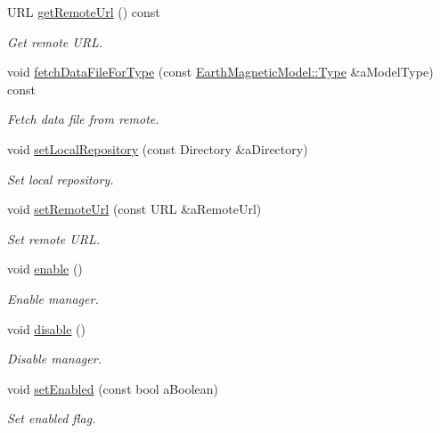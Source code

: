 \begin{DoxyCompactItemize}
U\+RL \hyperlink{classostk_1_1physics_1_1environment_1_1magnetic_1_1earth_1_1_manager_afb13ee2d8dc23d825960f0f2657f6df9}{get\+Remote\+Url} () const
\begin{DoxyCompactList}\small\item\em Get remote U\+RL. \end{DoxyCompactList}\item 
void \hyperlink{classostk_1_1physics_1_1environment_1_1magnetic_1_1earth_1_1_manager_ac671438e0faf3b1b2914a35d4f4f8edb}{fetch\+Data\+File\+For\+Type} (const \hyperlink{classostk_1_1physics_1_1environment_1_1magnetic_1_1_earth_a30a064d87b6fce338e76aebd3043b6b6}{Earth\+Magnetic\+Model\+::\+Type} \&a\+Model\+Type) const
\begin{DoxyCompactList}\small\item\em Fetch data file from remote. \end{DoxyCompactList}\item 
void \hyperlink{classostk_1_1physics_1_1environment_1_1magnetic_1_1earth_1_1_manager_a72535c0bb963e3936fa73e5d130d6889}{set\+Local\+Repository} (const Directory \&a\+Directory)
\begin{DoxyCompactList}\small\item\em Set local repository. \end{DoxyCompactList}\item 
void \hyperlink{classostk_1_1physics_1_1environment_1_1magnetic_1_1earth_1_1_manager_aba782ea0211d716b5a79e440de6cd433}{set\+Remote\+Url} (const U\+RL \&a\+Remote\+Url)
\begin{DoxyCompactList}\small\item\em Set remote U\+RL. \end{DoxyCompactList}\item 
void \hyperlink{classostk_1_1physics_1_1environment_1_1magnetic_1_1earth_1_1_manager_ab07420855f535d19cd92e0eea8cf5b10}{enable} ()
\begin{DoxyCompactList}\small\item\em Enable manager. \end{DoxyCompactList}\item 
void \hyperlink{classostk_1_1physics_1_1environment_1_1magnetic_1_1earth_1_1_manager_ae101f3b63e5789ad7657650fa0583085}{disable} ()
\begin{DoxyCompactList}\small\item\em Disable manager. \end{DoxyCompactList}\item 
void \hyperlink{classostk_1_1physics_1_1environment_1_1magnetic_1_1earth_1_1_manager_ab59c77b68f5a310ec44a87b8312a5458}{set\+Enabled} (const bool a\+Boolean)
\begin{DoxyCompactList}\small\item\em Set enabled flag. \end{DoxyCompactList}\end{DoxyCompactItemize}
